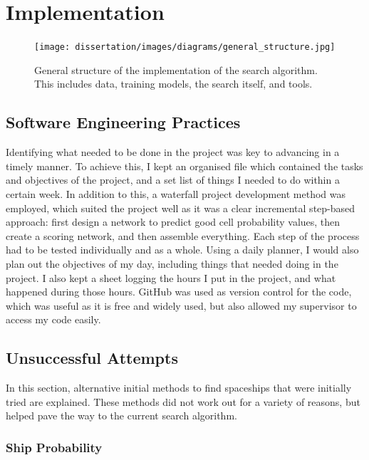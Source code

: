 \documentclass{l4proj}
\begin{document}
\chapter{Implementation}

\begin{figure}[h!]
\centering
\texttt{[image: dissertation/images/diagrams/general\_structure.jpg]} 
\caption{General structure of the implementation of the search algorithm. This includes data, training models, the search itself, and tools.}
\label{fig:subim1}
\end{figure}

\section{Software Engineering Practices}

Identifying what needed to be done in the project was key to advancing in a timely manner. To achieve this, I kept an organised file which contained the tasks and objectives of the project, and a set list of things I needed to do within a certain week. In addition to this, a waterfall project development method was employed, which suited the project well as it was a clear incremental step-based approach: first design a network to predict good cell probability values, then create a scoring network, and then assemble everything. Each step of the process had to be tested individually and as a whole. Using a daily planner, I would also plan out the objectives of my day, including things that needed doing in the project. I also kept a sheet logging the hours I put in the project, and what happened during those hours. GitHub was used as version control for the code, which was useful as it is free and widely used, but also allowed my supervisor to access my code easily.

\section {Unsuccessful Attempts}

In this section, alternative initial methods to find spaceships that were initially tried are explained. These methods did not work out for a variety of reasons, but helped pave the way to the current search algorithm. 

\subsection{Ship Probability}
\end{document}
